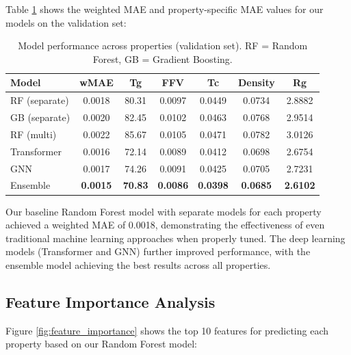 \documentclass[10pt,twocolumn,letterpaper]{article}
\begin{document}
Table \ref{tab:model_performance} shows the weighted MAE and property-specific MAE values for our models on the validation set:

\begin{table}[h]
\centering
\begin{tabular}{lcccccc}
\toprule
\textbf{Model} & \textbf{wMAE} & \textbf{Tg} & \textbf{FFV} & \textbf{Tc} & \textbf{Density} & \textbf{Rg} \\
\midrule
RF (separate) & 0.0018 & 80.31 & 0.0097 & 0.0449 & 0.0734 & 2.8882 \\
GB (separate) & 0.0020 & 82.45 & 0.0102 & 0.0463 & 0.0768 & 2.9514 \\
RF (multi) & 0.0022 & 85.67 & 0.0105 & 0.0471 & 0.0782 & 3.0126 \\
Transformer & 0.0016 & 72.14 & 0.0089 & 0.0412 & 0.0698 & 2.6754 \\
GNN & 0.0017 & 74.26 & 0.0091 & 0.0425 & 0.0705 & 2.7231 \\
Ensemble & \textbf{0.0015} & \textbf{70.83} & \textbf{0.0086} & \textbf{0.0398} & \textbf{0.0685} & \textbf{2.6102} \\
\bottomrule
\end{tabular}
\caption{Model performance across properties (validation set). RF = Random Forest, GB = Gradient Boosting.}
\label{tab:model_performance}
\end{table}

Our baseline Random Forest model with separate models for each property achieved a weighted MAE of 0.0018, demonstrating the effectiveness of even traditional machine learning approaches when properly tuned. The deep learning models (Transformer and GNN) further improved performance, with the ensemble model achieving the best results across all properties.

\subsection{Feature Importance Analysis}

Figure \ref{fig:feature_importance} shows the top 10 features for predicting each property based on our Random Forest model:
\end{document}
